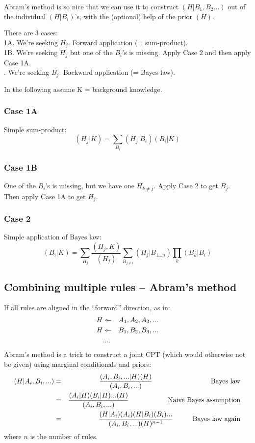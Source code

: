Abram's method is so nice that we can use it to construct $(H|B_1,B_2...)$ out of the individual
$(H|B_i)$'s, with the (optional) help of the prior $(H)$.

There are 3 cases:\\
\tab 1A. We're seeking $H_j$.  Forward application (= sum-product).\\
\tab 1B. We're seeking $H_j$ but one of the $B_i$'s is missing.  Apply Case 2 and
    then apply Case 1A.\\
. We're seeking $B_j$.  Backward application (= Bayes law).

In the following assume K = background knowledge.

\subsubsection{Case 1A}

Simple sum-product:
$$ (H_j|K) = \sum_{B_i} (H_j|B_i)(B_i|K) $$

\subsubsection{Case 1B}

One of the $B_i$'s is missing, but we have one $H_{k \neq j}$.  Apply Case 2 to get $B_j$.\\
Then apply Case 1A to get $H_j$.

\subsubsection{Case 2}

Simple application of Bayes law:
\begin{equation}
\label{eqn:apply-Bayes-law}
 (B_i|K) = \sum_{H_j} \frac{(H_j,K)}{(H_j)}
           \sum_{B_{j \neq i}} (H_j|B_{1...n}) \prod_k (B_k|B_i)
\end{equation}

\subsection{Combining multiple rules -- Abram's method}

If all rules are aligned in the ``forward'' direction, as in:
\begin{eqnarray}
H &\leftarrowtriangle& A_1, A_2, A_3, ... \nonumber \\
H &\leftarrowtriangle& B_1, B_2, B_3, ... \nonumber \\
  & .... &                    \nonumber
\end{eqnarray}
Abram's method is a trick to construct a joint CPT (which would otherwise not be given) using
marginal conditionals and priors:
\begin{eqnarray}
(H|A_i,B_i,...) &=& \frac{ (A_i,B_i,...|H)(H) } { (A_i,B_i,...) } \tab\tab\tab \mbox{Bayes law} \nonumber \\
 &=& \frac{ (A_i|H) (B_i|H) ... (H) }{ (A_i,B_i,...) } \tab\tab \mbox{Naive Bayes assumption} \nonumber \\
 &=& \frac{ (H|A_i) (A_i) (H|B_i) (B_i) ... }{ (A_i,B_i,...) (H)^{n-1} } \tab \mbox{Bayes law again} \nonumber
\end{eqnarray}
where $n$ is the number of rules.

